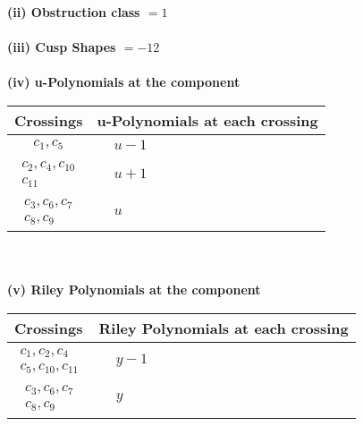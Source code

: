 \documentclass[1p]{elsarticle_modified}
\theoremstyle{definition}
\begin{document}
\flushleft \textbf{(ii) Obstruction class $= 1$}\\~\\
\flushleft \textbf{(iii) Cusp Shapes $= -12$}\\~\\
\newpage\renewcommand{\arraystretch}{1}
\flushleft \textbf{(iv) u-Polynomials at the component}\newline \\
\begin{tabular}{m{50pt}|m{274pt}}
Crossings & \hspace{64pt}u-Polynomials at each crossing \\
\hline $$\begin{aligned}c_{1},c_{5}\end{aligned}$$&$\begin{aligned}
&u-1
\end{aligned}$\\
\hline $$\begin{aligned}c_{2},c_{4},c_{10}\\c_{11}\end{aligned}$$&$\begin{aligned}
&u+1
\end{aligned}$\\
\hline $$\begin{aligned}c_{3},c_{6},c_{7}\\c_{8},c_{9}\end{aligned}$$&$\begin{aligned}
&u
\end{aligned}$\\
\hline
\end{tabular}\\~\\
\newpage\renewcommand{\arraystretch}{1}
\flushleft \textbf{(v) Riley Polynomials at the component}\newline \\
\begin{tabular}{m{50pt}|m{274pt}}
Crossings & \hspace{64pt}Riley Polynomials at each crossing \\
\hline $$\begin{aligned}c_{1},c_{2},c_{4}\\c_{5},c_{10},c_{11}\end{aligned}$$&$\begin{aligned}
&y-1
\end{aligned}$\\
\hline $$\begin{aligned}c_{3},c_{6},c_{7}\\c_{8},c_{9}\end{aligned}$$&$\begin{aligned}
&y
\end{aligned}$\\
\hline
\end{tabular}\\~\\
\end{document}
